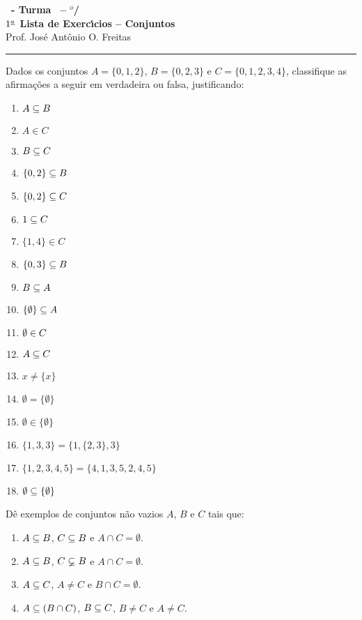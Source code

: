 \documentclass[12pt]{exam}
\begin{document}
    \begin{center}
    {\Large\bf \disciplina\ - Turma \turma\ -- \semestre$^{o}$/\ano} \\ \vspace{9pt} {\large\bf
      $1^{\underline{a}}$ Lista de Exerc{\'\i}cios -- Conjuntos}\\ \vspace{9pt} Prof. Jos{\'e} Ant{\^o}nio O. Freitas
    \end{center}
    \hrule


    \vspace{.6cm}

    \questao{} Dados os conjuntos $A = \{0,1,2\}$, $B = \{0,2,3\}$ e $C = \{0,1,2,3,4\}$, classifique as afirma\c{c}\~oes a seguir em verdadeira ou falsa, justificando:
    \begin{multicols}{2}
        \begin{enumerate}[label={\alph*})]
            \item $A \subseteq B$
            \item $A \in C$
            \item $B \subseteq C$
            \item $\{0,2\} \subseteq B$
            \item $\{0,2\} \subseteq C$
            \item $1 \subseteq C$
            \item $\{1,4\} \in C$
            \item $\{0,3\} \subseteq B$
            \item $B \subseteq A$
            \item $\{\emptyset\} \subseteq A$
            \item $\emptyset \in C$
            \item $A \subseteq C$
            \item $x \neq \{x\}$
            \item $\emptyset = \{\emptyset\}$
            \item $\emptyset \in \{\emptyset\}$
            \item $\{1, 3, 3\} = \{1, \{2, 3\}, 3\}$
            \item $\{1, 2, 3, 4, 5\} = \{4, 1, 3, 5, 2, 4, 5\}$
            \item $\emptyset \subseteq \{\emptyset\}$
        \end{enumerate} 
    \end{multicols}

    \questao{} D\^e exemplos de conjuntos n\~ao vazios $A$, $B$ e $C$ tais que:
    \begin{enumerate}[label={\alph*})]
        \item $A \subseteq B$, $C \subseteq B$ e $A \cap C = \emptyset$.
        \item $A \subseteq B$, $C \varsubsetneq B$ e $A \cap C = \emptyset$.
        \item $A \subseteq C$, $A \ne C$ e $B \cap C = \emptyset$.
        \item $A \subseteq (B \cap C)$, $B \subseteq C$, $B \ne C$ e $A \ne C$.
    \end{enumerate}
\end{document}

